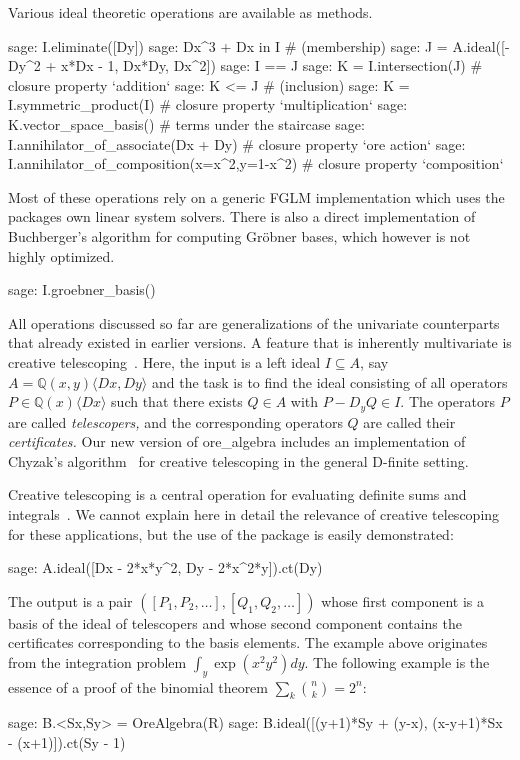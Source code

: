 \documentclass[11pt]{article}
\def\<#1>{\langle#1\rangle}
\let\set\mathbb
\begin{document}
Various ideal theoretic operations are available as methods. 
\begin{sageexample}
  sage: I.eliminate([Dy])
  sage: Dx^3 + Dx in I # (membership)
  sage: J = A.ideal([-Dy^2 + x*Dx - 1, Dx*Dy, Dx^2])
  sage: I == J
  sage: K = I.intersection(J) # closure property `addition`
  sage: K <= J # (inclusion)
  sage: K = I.symmetric_product(I) # closure property `multiplication`
  sage: K.vector_space_basis() # terms under the staircase
  sage: I.annihilator_of_associate(Dx + Dy) # closure property `ore action`
  sage: I.annihilator_of_composition(x=x^2,y=1-x^2) # closure property `composition`
\end{sageexample}
Most of these operations rely on a generic FGLM implementation which uses the packages own linear system solvers.
There is also a direct implementation of Buchberger's algorithm for computing Gr\"obner bases, which however is
not highly optimized. 
\begin{sageexample}
  sage: I.groebner_basis()
\end{sageexample}

All operations discussed so far are generalizations of the univariate counterparts that already existed
in earlier versions. A feature that is inherently multivariate is creative telescoping~\cite{zeilberger91,chyzak00,chyzak14}.
Here, the input is a left ideal $I\subseteq A$, say $A=\set Q(x,y)\<Dx,Dy>$ and the task is to find
the ideal consisting of all operators $P\in\set Q(x)\<Dx>$ such that there exists $Q\in A$ with $P-D_yQ\in I$.
The operators $P$ are called \emph{telescopers,} and the corresponding operators $Q$ are called their \emph{certificates.}
Our new version of ore\_algebra includes an implementation of Chyzak's algorithm~\cite{chyzak00} for creative telescoping in the general D-finite setting.

Creative telescoping is a central operation for evaluating definite sums and integrals~\cite{chyzak14}.
We cannot explain here in detail the relevance of creative telescoping for these applications, but the use of the
package is easily demonstrated:
\begin{sageexample}
  sage: A.ideal([Dx - 2*x*y^2, Dy - 2*x^2*y]).ct(Dy)
\end{sageexample}
The output is a pair $([P_1,P_2,\dots],[Q_1,Q_2,\dots])$ whose first component is a basis of the ideal of telescopers
and whose second component contains the certificates corresponding to the basis elements.
The example above originates from the integration problem $\int_y\exp(x^2y^2)dy$. The following example is the essence
of a proof of the binomial theorem $\sum_k\binom nk=2^n$:
\begin{sageexample}
  sage: B.<Sx,Sy> = OreAlgebra(R)
  sage: B.ideal([(y+1)*Sy + (y-x), (x-y+1)*Sx - (x+1)]).ct(Sy - 1)
\end{sageexample}
\end{document}
